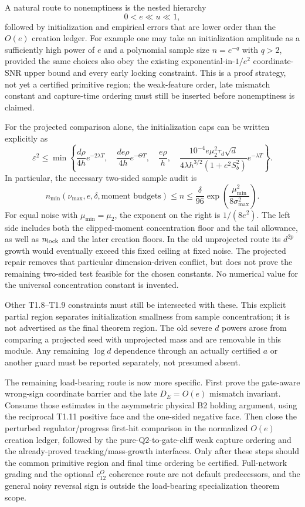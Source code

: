 \documentclass{article} %
\theoremstyle{plain}
\theoremstyle{definition}
\theoremstyle{remark}
\begin{document}
A natural route to nonemptiness is the nested hierarchy
\[
 0<e\ll u\ll1,
\]
followed by initialization and empirical errors that are lower order than the
$O(e)$ creation ledger.  For example one may take an initialization amplitude
as a sufficiently high power of $e$ and a polynomial sample size
$n=e^{-q}$ with $q>2$, provided the same choices also obey the existing
exponential-in-$1/e^2$ coordinate-SNR upper bound and every early locking
constraint.  This is a proof strategy, not yet a certified primitive region;
the weak-feature order, late mismatch constant and capture-time ordering must
still be inserted before nonemptiness is claimed.

For the projected comparison alone, the initialization caps can be
written explicitly as
\[
 \varepsilon^2\le\min\left\{
 \frac{d\rho}{4h}e^{-2\lambda T},\quad
 \frac{de\rho}{4h}e^{-\Theta T},\quad
 \frac{e\rho}{h},\quad
 \frac{10^{-4}e\mu_2^2\tau_d\sqrt d}
 {4\lambda h^{3/2}(1+e^2S_b^2)}e^{-\lambda T}\right\}.
\]
In particular, the necessary two-sided sample audit is
\[
 n_{\min}(\nu_{\max},e,\delta,\text{moment budgets})
 \le n\le\frac{\delta}{96}
       \exp\!\left(\frac{\mu_{\min}^2}{8\sigma_{\max}^2}\right).
\]
For equal noise with $\mu_{\min}=\mu_2$, the exponent on the right is
$1/(8e^2)$. The left side includes both the clipped-moment concentration
floor and the tail allowance, as well as $n_{\rm lock}$ and the later
creation floors. In the old unprojected route its $d^{2p}$ growth would
eventually exceed this fixed ceiling at fixed noise. The projected
repair removes that particular dimension-driven conflict, but does not
prove the remaining two-sided test feasible for the chosen constants.
No numerical value for the universal concentration constant is invented.

Other T1.8--T1.9 constraints must still be intersected with these.
This explicit partial region separates initialization smallness from
sample concentration; it is not advertised as the final theorem region.
The old severe $d$ powers arose from comparing a projected seed with
unprojected mass and are removable in this module. Any remaining
$\log d$ dependence through an actually certified $a$ or another guard
must be reported separately, not presumed absent.

The remaining load-bearing route is now more specific.  First prove the
gate-aware wrong-sign coordinate barrier and the late $D_E=O(e)$ mismatch
invariant.  Consume those estimates in the asymmetric physical B2 holding
argument, using the reciprocal T1.11 positive face and the one-sided negative
face.  Then close the perturbed regulator/progress first-hit comparison in the
normalized $O(e)$ creation ledger, followed by the pure-Q2-to-gate-cliff weak
capture ordering and the already-proved tracking/mass-growth interfaces.
Only after these steps should the common primitive region and final time
ordering be certified.  Full-network grading and the optional $c_{12}^O$
coherence route are not default predecessors, and the general noisy reversal
sign is outside the load-bearing specialization theorem scope.
\end{document}
